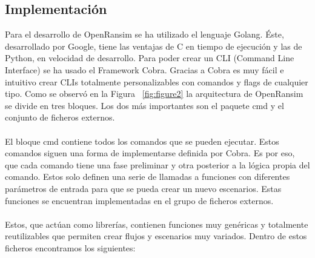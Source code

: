 \documentclass[a4paper,12pt]{article}
\begin{document}
\subsection{Implementación}
Para el desarrollo de OpenRansim se ha utilizado el lenguaje Golang. Éste, desarrollado por Google, tiene las ventajas de C en tiempo de ejecución y las de Python\cite{python}, en velocidad de desarrollo. Para poder crear un CLI (Command Line Interface) se ha usado el Framework Cobra\cite{cobra}. Gracias a Cobra es muy fácil e intuitivo crear CLIs totalmente personalizables con comandos y flags de cualquier tipo. Como se observó en la Figura ~\ref{fig:figure2} la arquitectura de OpenRansim se divide en tres bloques. Los dos más importantes son el paquete cmd y el conjunto de ficheros externos.\\\\
El bloque cmd contiene todos los comandos que se pueden ejecutar. Estos comandos siguen una forma de implementarse definida por Cobra. Es por eso, que cada comando tiene una fase preliminar y otra posterior a la lógica propia del comando. Estos solo definen una serie de llamadas a funciones con diferentes parámetros de entrada para que se pueda crear un nuevo escenarios. Estas funciones se encuentran implementadas en el grupo de ficheros externos.\\\\
Estos, que actúan como librerías, contienen funciones muy genéricas y totalmente reutilizables que permiten crear flujos y escenarios muy variados. Dentro de estos ficheros encontramos los siguientes:
\end{document}
